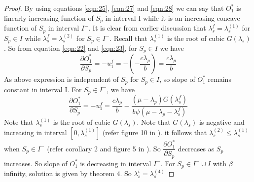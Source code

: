 \documentclass[12pt, a4paper]{report}
\begin{document}
\begin{proof}
By using equations \ref{eqn:25}, \ref{eqn:27} and \ref{eqn:28} we can say that $O_1^*$ is linearly increasing function of $S_p$ in interval I while it is an increasing concave function of $S_p$ in interval $I^-$. It is clear from earlier discussion that $\lambda_s^f = \lambda_s^{(1)}$ for $S_p \in I$ while $\lambda_s^f = \lambda_s^{(2)}$ for $S_p \in I^-$. Recall that $\lambda_s^{(1)}$ is the root of cubic $G(\lambda_s)$. So from equation \ref{eqn:22} and \ref{eqn:23}, for $S_p \in I$ we have 
\begin{equation}
\dfrac{\partial O_1^*}{\partial S_p} = -u_1^f = -\left(-\dfrac{c\lambda_p}{b}\right) =  \dfrac{c\lambda_p}{b}
\end{equation}
As above expression is independent of $S_p$ for $S_p \in I$, so slope of $O_1^*$ remains constant in interval I. For $S_p \in I^-$, we have
\begin{equation}
\dfrac{\partial O_1^*}{\partial S_p} = -u_1^f = \dfrac{c\lambda_p}{b}-\dfrac{(\mu-\lambda_p)G(\lambda_s^f)}{b\psi(\mu-\lambda_p-\lambda_s^f)}
\end{equation}
Note that $\lambda_s^{(1)}$ is the root of cubic $G(\lambda_s)$. Note that $G(\lambda_s)$ is negative and increasing in interval $[0,\lambda_s^{(1)}]$ (refer figure 10 in \cite{Sudhir_standard_style}). it follows that $\lambda_s^{(2)} \leq \lambda_s^{(1)}$ when $S_p \in I^-$ (refer corollary 2 and figure 5 in \cite{Sudhir_standard_style}). So $\dfrac{\partial O_1^*}{\partial S_p}$ decreases as $S_p$ increases. So slope of $O_1^*$ is decreasing in interval $I^-$. For $S_p \in I^- \cup I$ with $\beta$ infinity, solution is given by theorem 4. So $\lambda_s^i = \lambda_s^{(4)}$


\end{proof}
\end{document}
